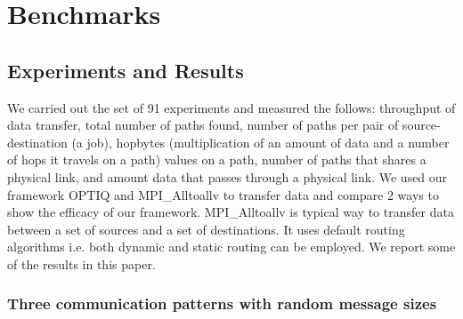 \section{Benchmarks}
\label{sec:benchmark}







\subsection{Experiments and Results}

We carried out the set of 91 experiments and measured the follows: throughput of data transfer, total number of paths found, number of paths per pair of source-destination (a job), hopbytes (multiplication of an amount of data and a number of hops it travels on a path) values on a path, number of paths that shares a physical link, and amount data that passes through a physical link. We used our framework OPTIQ and MPI\_Alltoallv to transfer data and compare 2 ways to show the efficacy of our framework. MPI\_Alltoallv is typical way to transfer data between a set of sources and a set of destinations. It uses default routing algorithms i.e. both dynamic and static routing can be employed. We report some of the results in this paper.



\subsubsection {Three communication patterns with random message sizes}

